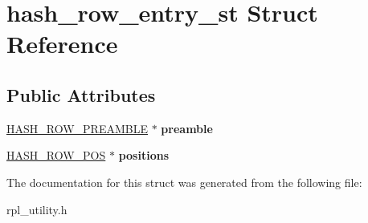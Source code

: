 \hypertarget{structhash__row__entry__st}{}\section{hash\+\_\+row\+\_\+entry\+\_\+st Struct Reference}
\label{structhash__row__entry__st}
\subsection*{Public Attributes}
\begin{DoxyCompactItemize}
\item 
\mbox{\label{structhash__row__entry__st_a6747f623a9e0607b54ad43f70eb42c8d}} 
\mbox{\hyperlink{structhash__row__preamble__st}{H\+A\+S\+H\+\_\+\+R\+O\+W\+\_\+\+P\+R\+E\+A\+M\+B\+LE}} $\ast$ {\bfseries preamble}
\item 
\mbox{\label{structhash__row__entry__st_a371518050ae46fc81c26901ebdd08cce}} 
\mbox{\hyperlink{structhash__row__pos__st}{H\+A\+S\+H\+\_\+\+R\+O\+W\+\_\+\+P\+OS}} $\ast$ {\bfseries positions}
\end{DoxyCompactItemize}


The documentation for this struct was generated from the following file\+:\begin{DoxyCompactItemize}
\item 
rpl\+\_\+utility.\+h\end{DoxyCompactItemize}
